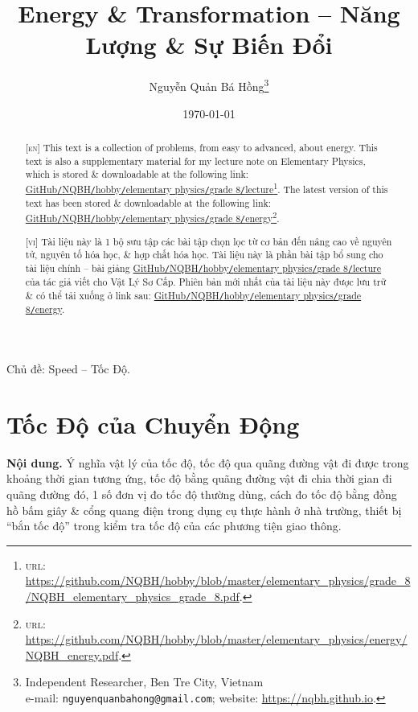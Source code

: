 \documentclass{article}
\title{Energy \& Transformation -- Năng Lượng \& Sự Biến Đổi}
\author{Nguyễn Quản Bá Hồng\footnote{Independent Researcher, Ben Tre City, Vietnam\\e-mail: \texttt{nguyenquanbahong@gmail.com}; website: \url{https://nqbh.github.io}.}}
\date{\today}
\begin{document}
\maketitle
\begin{abstract}
	\textsc{[en]} This text is a collection of problems, from easy to advanced, about energy. This text is also a supplementary material for my lecture note on Elementary Physics, which is stored \& downloadable at the following link: \href{https://github.com/NQBH/hobby/blob/master/elementary_physics/grade_8/NQBH_elementary_physics_grade_8.pdf}{GitHub\texttt{/}NQBH\texttt{/}hobby\texttt{/}elementary physics\texttt{/}grade 8\texttt{/}lecture}\footnote{\textsc{url}: \url{https://github.com/NQBH/hobby/blob/master/elementary_physics/grade_8/NQBH_elementary_physics_grade_8.pdf}.}. The latest version of this text has been stored \& downloadable at the following link:\\\href{https://github.com/NQBH/hobby/blob/master/elementary_physics/energy/NQBH_energy.pdf}{GitHub\texttt{/}NQBH\texttt{/}hobby\texttt{/}elementary physics\texttt{/}grade 8\texttt{/}energy}\footnote{\textsc{url}: \url{https://github.com/NQBH/hobby/blob/master/elementary_physics/energy/NQBH_energy.pdf}.}.
	\vspace{2mm}
	
	\textsc{[vi]} Tài liệu này là 1 bộ sưu tập các bài tập chọn lọc từ cơ bản đến nâng cao về nguyên tử, nguyên tố hóa học, \& hợp chất hóa học. Tài liệu này là phần bài tập bổ sung cho tài liệu chính -- bài giảng \href{https://github.com/NQBH/hobby/blob/master/elementary_physics/grade_8/NQBH_elementary_physics_grade_8.pdf}{GitHub\texttt{/}NQBH\texttt{/}hobby\texttt{/}elementary physics\texttt{/}grade 8\texttt{/}lecture} của tác giả viết cho Vật Lý Sơ Cấp. Phiên bản mới nhất của tài liệu này được lưu trữ \& có thể tải xuống ở link sau: \href{https://github.com/NQBH/hobby/blob/master/elementary_physics/grade_8/real/NQBH_real.pdf}{GitHub\texttt{/}NQBH\texttt{/}hobby\texttt{/}elementary physics\texttt{/}grade 8\texttt{/}energy}.
\end{abstract}
\setcounter{secnumdepth}{4}
\setcounter{tocdepth}{3}
\tableofcontents
\newpage


\begin{center}\LARGE
	Chủ đề: Speed -- Tốc Độ.
\end{center}

\section{Tốc Độ của Chuyển Động}
\textsf{\textbf{Nội dung.} Ý nghĩa vật lý của tốc độ, tốc độ qua quãng đường vật đi được trong khoảng thời gian tương ứng, tốc độ bằng quãng đường vật đi chia thời gian đi quãng đường đó, 1 số đơn vị đo tốc độ thường dùng, cách đo tốc độ bằng đồng hồ bấm giây \& cổng quang điện trong dụng cụ thực hành ở nhà trường, thiết bị ``bắn tốc độ'' trong kiểm tra tốc độ của các phương tiện giao thông.}
\end{document}
